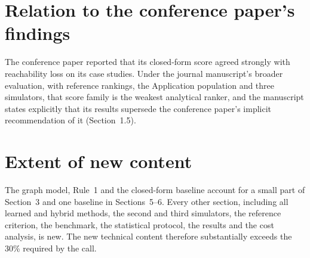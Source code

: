 \documentclass[11pt]{article}
\begin{document}
\section*{Relation to the conference paper's findings}
The conference paper reported that its closed-form score agreed strongly with reachability loss on its case studies. Under the journal manuscript's broader evaluation, with reference rankings, the Application population and three simulators, that score family is the weakest analytical ranker, and the manuscript states explicitly that its results supersede the conference paper's implicit recommendation of it (Section~1.5).

\section*{Extent of new content}
The graph model, Rule~1 and the closed-form baseline account for a small part of Section~3 and one baseline in Sections~5--6. Every other section, including all learned and hybrid methods, the second and third simulators, the reference criterion, the benchmark, the statistical protocol, the results and the cost analysis, is new. The new technical content therefore substantially exceeds the 30\% required by the call.
\end{document}
